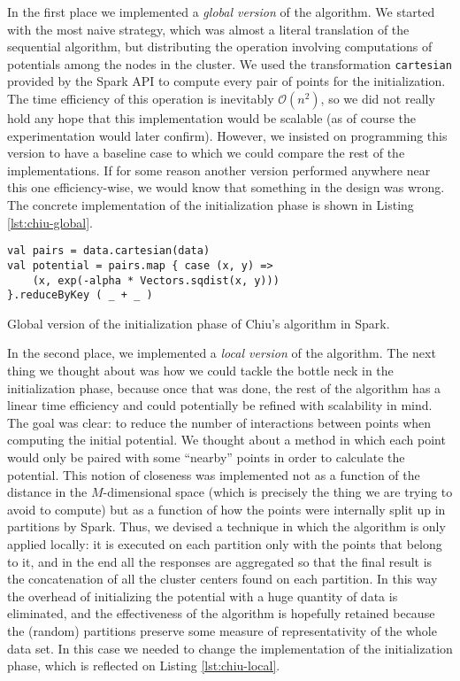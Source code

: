 In the first place we implemented a \textit{global version} of the algorithm. We started with the most naive strategy, which was almost a literal translation of the sequential algorithm, but distributing the operation involving computations of potentials among the nodes in the cluster. We used the transformation \verb|cartesian| provided by the Spark API to compute every pair of points for the initialization. The time efficiency of this operation is inevitably $\mathcal O(n^2)$, so we did not really hold any hope that this implementation would be scalable (as of course the experimentation would later confirm). However, we insisted on programming this version to have a baseline case to which we could compare the rest of the implementations. If for some reason another version performed anywhere near this one efficiency-wise, we would know that something in the design was wrong. The concrete implementation of the initialization phase is shown in Listing \ref{lst:chiu-global}.

\begin{Listing}[h!]
\begin{lstlisting}[basicstyle=\normalsize\ttfamily, xleftmargin=.5cm, aboveskip=0em, belowskip=0em]
val pairs = data.cartesian(data)
val potential = pairs.map { case (x, y) =>
    (x, exp(-alpha * Vectors.sqdist(x, y)))
}.reduceByKey ( _ + _ )
\end{lstlisting}
\caption{Global version of the initialization phase of Chiu's algorithm in Spark.}
  \label{lst:chiu-global}
\end{Listing}

In the second place, we implemented a \textit{local version} of the algorithm. The next thing we thought about was how we could tackle the bottle neck in the initialization phase, because once that was done, the rest of the algorithm has a linear time efficiency and could potentially be refined with scalability in mind. The goal was clear: to reduce the number of interactions between points when computing the initial potential. We thought about a method in which each point would only be paired with some ``nearby'' points in order to calculate the potential. This notion of closeness was implemented not as a function of the distance in the $M$-dimensional space (which is precisely the thing we are trying to avoid to compute) but as a function of how the points were internally split up in partitions by Spark. Thus, we devised a technique in which the algorithm is only applied locally: it is executed on each partition only with the points that belong to it, and in the end all the responses are aggregated so that the final result is the concatenation of all the cluster centers found on each partition. In this way the overhead of initializing the potential with a huge quantity of data is eliminated, and the effectiveness of the algorithm is hopefully retained because the (random) partitions preserve some measure of representativity of the whole data set. In this case we needed to change the implementation of the initialization phase, which is reflected on Listing \ref{lst:chiu-local}.

